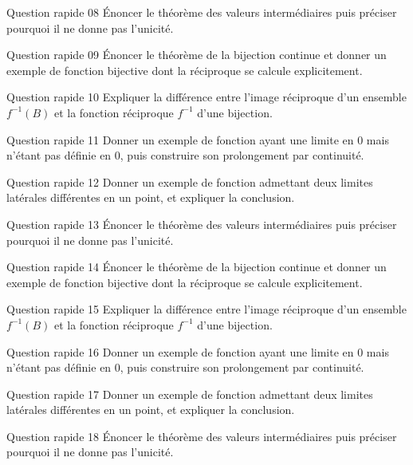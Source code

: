 \documentclass[11pt,a4paper]{article}
\begin{document}
\begin{exobox}{Question rapide 08}
Énoncer le théorème des valeurs intermédiaires puis préciser pourquoi il ne donne pas l'unicité.
\end{exobox}
\begin{exobox}{Question rapide 09}
Énoncer le théorème de la bijection continue et donner un exemple de fonction bijective dont la réciproque se calcule explicitement.
\end{exobox}
\begin{exobox}{Question rapide 10}
Expliquer la différence entre l'image réciproque d'un ensemble $f^{-1}(B)$ et la fonction réciproque $f^{-1}$ d'une bijection.
\end{exobox}
\begin{exobox}{Question rapide 11}
Donner un exemple de fonction ayant une limite en $0$ mais n'étant pas définie en $0$, puis construire son prolongement par continuité.
\end{exobox}
\begin{exobox}{Question rapide 12}
Donner un exemple de fonction admettant deux limites latérales différentes en un point, et expliquer la conclusion.
\end{exobox}
\begin{exobox}{Question rapide 13}
Énoncer le théorème des valeurs intermédiaires puis préciser pourquoi il ne donne pas l'unicité.
\end{exobox}
\begin{exobox}{Question rapide 14}
Énoncer le théorème de la bijection continue et donner un exemple de fonction bijective dont la réciproque se calcule explicitement.
\end{exobox}
\begin{exobox}{Question rapide 15}
Expliquer la différence entre l'image réciproque d'un ensemble $f^{-1}(B)$ et la fonction réciproque $f^{-1}$ d'une bijection.
\end{exobox}
\begin{exobox}{Question rapide 16}
Donner un exemple de fonction ayant une limite en $0$ mais n'étant pas définie en $0$, puis construire son prolongement par continuité.
\end{exobox}
\begin{exobox}{Question rapide 17}
Donner un exemple de fonction admettant deux limites latérales différentes en un point, et expliquer la conclusion.
\end{exobox}
\begin{exobox}{Question rapide 18}
Énoncer le théorème des valeurs intermédiaires puis préciser pourquoi il ne donne pas l'unicité.
\end{exobox}
\end{document}
